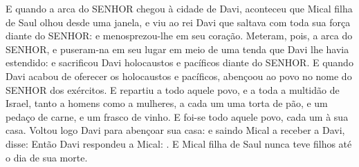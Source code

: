 {  E quando a arca do SENHOR chegou à cidade de Davi, aconteceu que Mical filha de Saul olhou desde uma janela, e viu ao rei Davi que saltava com toda sua força diante do SENHOR: e menosprezou-lhe em seu coração.
  Meteram, pois, a arca do SENHOR, e puseram-na em seu lugar em meio de uma tenda que Davi lhe havia estendido: e sacrificou Davi holocaustos e pacíficos diante do SENHOR.
  E quando Davi acabou de oferecer os holocaustos e pacíficos, abençoou ao povo no nome do SENHOR dos exércitos.
  E repartiu a todo aquele povo, e a toda a multidão de Israel, tanto a homens como a mulheres, a cada um uma torta de pão, e um pedaço de carne, e um frasco de vinho. E foi-se todo aquele povo, cada um à sua casa.
  Voltou logo Davi para abençoar sua casa: e saindo Mical a receber a Davi, disse: 
  Então Davi respondeu a Mical: .
  E Mical filha de Saul nunca teve filhos até o dia de sua morte.
\par }

